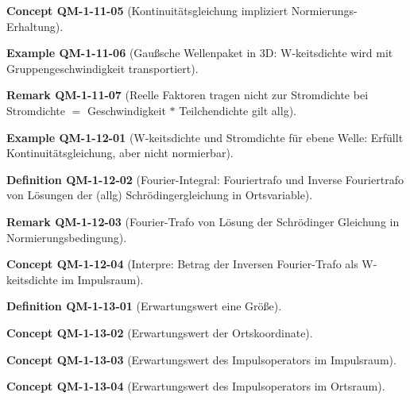 \documentclass[10pt, letterpaper]{article}
\newcommand{\CustomHeading}[3]{%
  \par\medskip\noindent%
  \textbf{#1 #2} \textnormal{(#3)}.\enskip%
}
\newenvironment{DEF}[2]{\CustomHeading{Definition}{#1}{#2}}{}
\newenvironment{REM}[2]{\CustomHeading{Remark}{#1}{#2}}{}
\newenvironment{EXA}[2]{\CustomHeading{Example}{#1}{#2}}{}
\newenvironment{CONC}[2]{\CustomHeading{Concept}{#1}{#2}}{}
\begin{document}
\begin{CONC}{QM-1-11-05}{Kontinuitätsgleichung impliziert Normierungs-Erhaltung}
\end{CONC}

\begin{EXA}{QM-1-11-06}{Gaußsche Wellenpaket in 3D: W-keitsdichte wird mit Gruppengeschwindigkeit transportiert}
\end{EXA}

\begin{REM}{QM-1-11-07}{Reelle Faktoren tragen nicht zur Stromdichte bei 
Stromdichte $=$ Geschwindigkeit $*$ Teilchendichte gilt allg}
\end{REM}

\begin{EXA}{QM-1-12-01}{W-keitsdichte und Stromdichte für ebene Welle: Erfüllt Kontinuitätsgleichung, aber nicht normierbar}
\end{EXA}

\begin{DEF}{QM-1-12-02}{Fourier-Integral: Fouriertrafo und Inverse Fouriertrafo von Lösungen der (allg) Schrödingergleichung in Ortsvariable}
\end{DEF}

\begin{REM}{QM-1-12-03}{Fourier-Trafo von Lösung der Schrödinger Gleichung in Normierungsbedingung}
\end{REM}

\begin{CONC}{QM-1-12-04}{Interpre: Betrag der Inversen Fourier-Trafo als W-keitsdichte im Impulsraum}
\end{CONC}

\begin{DEF}{QM-1-13-01}{Erwartungswert eine Größe}
\end{DEF}

\begin{CONC}{QM-1-13-02}{Erwartungswert der Ortskoordinate}
\end{CONC}

\begin{CONC}{QM-1-13-03}{Erwartungswert des Impulsoperators im Impulsraum}
\end{CONC}

\begin{CONC}{QM-1-13-04}{Erwartungswert des Impulsoperators im Ortsraum}
\end{CONC}
\end{document}

